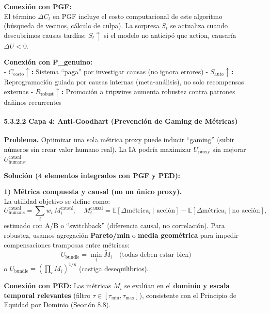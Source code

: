 \textbf{Conexión con PGF:}\\
El término \(\Delta C_t\) en PGF incluye el costo computacional de este
algoritmo (búsqueda de vecinos, cálculo de culpa). La sorpresa \(S_t\)
se actualiza cuando descubrimos causas tardías: \(S_t \uparrow\) si el
modelo no anticipó que \(\text{action}_i\) causaría \(\Delta U < 0\).

\textbf{Conexión con P\_genuino:}\\
- \textbf{\(C_{\text{costo}} \uparrow\):} Sistema ``paga'' por
investigar causas (no ignora errores) -
\textbf{\(S_{\text{auto}} \uparrow\):} Reprogramación guiada por causas
internas (meta-análisis), no solo recompensas externas -
\textbf{\(R_{\text{robust}} \uparrow\):} Promoción a tripwires aumenta
robustez contra patrones dañinos recurrentes

\paragraph{5.3.2.2 Capa 4: Anti-Goodhart (Prevención de Gaming de
Métricas)}\label{capa-4-anti-goodhart-prevenciuxf3n-de-gaming-de-muxe9tricas}

\textbf{Problema.} Optimizar una sola métrica proxy puede inducir
``gaming'' (subir números sin crear valor humano real). La IA podría
maximizar \(U_{\text{proxy}}\) sin mejorar
\(U_{\text{humans}}^{\text{causal}}\).

\textbf{Solución (4 elementos integrados con PGF y PED):}

\textbf{1) Métrica compuesta y causal (no un único proxy).}\\
La utilidad objetivo se define como: \[
U_{\text{humans}}^{\text{causal}} = \sum_i w_i \, M_i^{\text{causal}}, \quad
M_i^{\text{causal}} = \mathbb{E}[\Delta\text{métrica}_i \mid \text{acción}] - \mathbb{E}[\Delta\text{métrica}_i \mid \text{no acción}],
\] estimado con A/B o ``switchback'' (diferencia causal, no
correlación). Para robustez, usamos agregación \textbf{Pareto/min} o
\textbf{media geométrica} para impedir compensaciones tramposas entre
métricas: \[
U_{\text{bundle}} = \min_i \tilde{M}_i \quad \text{(todas deben estar bien)}
\] o \(U_{\text{bundle}} = \left(\prod_i M_i\right)^{1/n}\) (castiga
desequilibrios).

\textbf{Conexión con PED:} Las métricas \(M_i\) se evalúan en el
\textbf{dominio y escala temporal relevantes} (filtro
\(\tau \in [\tau_{\min}, \tau_{\max}]\)), consistente con el Principio
de Equidad por Dominio (Sección 8.8).

